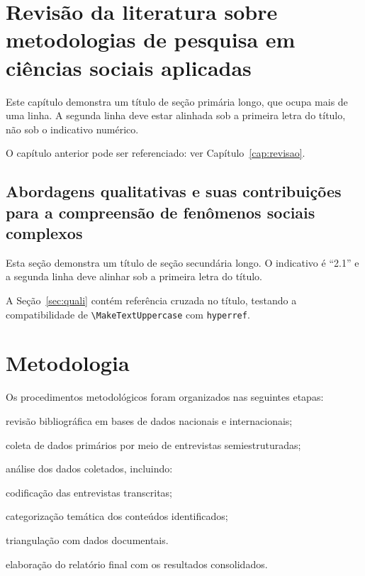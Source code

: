 \documentclass[a4paper, 12pt]{report}
\begin{document}
\chapter{Revisão da literatura sobre metodologias de pesquisa em ciências
sociais aplicadas\label{cap:revisao}}

Este capítulo demonstra um título de seção primária longo, que ocupa mais de
uma linha. A segunda linha deve estar alinhada sob a primeira letra do título,
não sob o indicativo numérico.

O capítulo anterior pode ser referenciado: ver Capítulo~\ref{cap:revisao}.

\section{Abordagens qualitativas e suas contribuições para a compreensão de
fenômenos sociais complexos\label{sec:quali}}

Esta seção demonstra um título de seção secundária longo. O indicativo é
``2.1'' e a segunda linha deve alinhar sob a primeira letra do título.

A Seção~\ref{sec:quali} contém referência cruzada no título, testando a
compatibilidade de \verb|\MakeTextUppercase| com \verb|hyperref|.

\chapter{Metodologia}

Os procedimentos metodológicos foram organizados nas seguintes etapas:

\begin{alineas}
  \item revisão bibliográfica em bases de dados nacionais e internacionais;
  \item coleta de dados primários por meio de entrevistas semiestruturadas;
  \item análise dos dados coletados, incluindo:
    \begin{subalineas}
      \item codificação das entrevistas transcritas;
      \item categorização temática dos conteúdos identificados;
      \item triangulação com dados documentais.
    \end{subalineas}
  \item elaboração do relatório final com os resultados consolidados.
\end{alineas}
\end{document}
